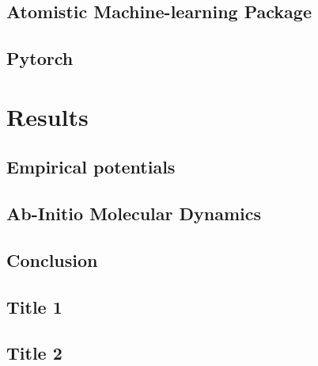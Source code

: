 \documentclass[12pt]{report}
\begin{document}
\chapter{Atomistic Machine-learning Package}

\chapter{Pytorch}

\part{Results}

\chapter{Empirical potentials}

\chapter{Ab-Initio Molecular Dynamics}
 
\chapter{Conclusion}


\begin{appendices}

\chapter{Title 1}

\chapter{Title 2}

\end{appendices}

\printbibliography
\end{document}
